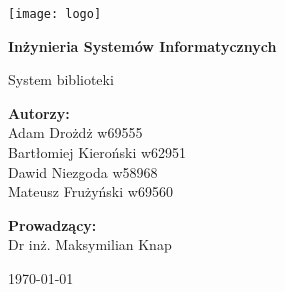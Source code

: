 \begin{titlepage}
    \begin{center}
    
    \texttt{[image: logo]}
    \vspace*{1cm}

        \Huge
        \textbf{Inżynieria Systemów Informatycznych}
 
        \vspace{0.5cm}
        \Large
        System biblioteki
             
        \vspace{1.5cm}
 
        \textbf{Autorzy:}   \\ Adam Drożdż w69555 \\
                            Bartłomiej Kieroński w62951 \\
                            Dawid Niezgoda w58968 \\
                            Mateusz Frużyński w69560

        \vspace*{1cm}
        \textbf{Prowadzący:} \\ Dr inż. Maksymilian Knap
 
        \vfill
            
        \today
             
    \end{center}
 \end{titlepage}